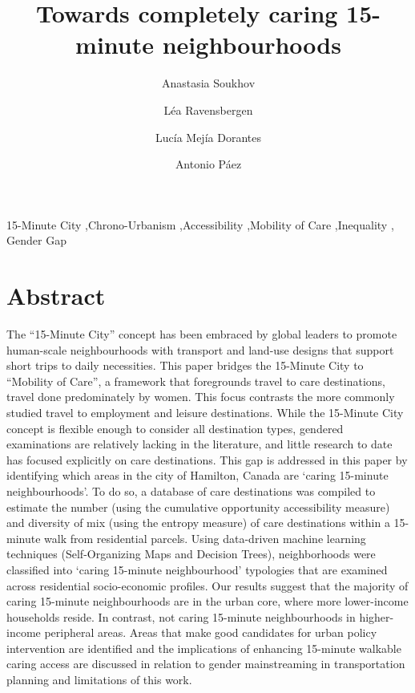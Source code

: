 \documentclass[
  authoryear,
  preprint,
  3p]{elsarticle}
\begin{document}
\begin{frontmatter}
\title{Towards completely caring 15-minute neighbourhoods}
\author[1]{Anastasia Soukhov%
%
}
\author[1]{Léa Ravensbergen%
%
}
\author[2]{Lucía Mejía Dorantes%
%
}
\author[1]{Antonio Páez%
%
}






        





\begin{keyword}
    15-Minute City \sep Chrono-Urbanism \sep Accessibility \sep Mobility
of Care \sep Inequality \sep 
    Gender Gap
\end{keyword}
\end{frontmatter}
    
\section{Abstract}\label{abstract}

The ``15-Minute City'' concept has been embraced by global leaders to
promote human-scale neighbourhoods with transport and land-use designs
that support short trips to daily necessities. This paper bridges the
15-Minute City to ``Mobility of Care'', a framework that foregrounds
travel to care destinations, travel done predominately by women. This
focus contrasts the more commonly studied travel to employment and
leisure destinations. While the 15-Minute City concept is flexible
enough to consider all destination types, gendered examinations are
relatively lacking in the literature, and little research to date has
focused explicitly on care destinations. This gap is addressed in this
paper by identifying which areas in the city of Hamilton, Canada are
`caring 15-minute neighbourhoods'. To do so, a database of care
destinations was compiled to estimate the number (using the cumulative
opportunity accessibility measure) and diversity of mix (using the
entropy measure) of care destinations within a 15-minute walk from
residential parcels. Using data-driven machine learning techniques
(Self-Organizing Maps and Decision Trees), neighborhoods were classified
into `caring 15-minute neighbourhood' typologies that are examined
across residential socio-economic profiles. Our results suggest that the
majority of caring 15-minute neighbourhoods are in the urban core, where
more lower-income households reside. In contrast, not caring 15-minute
neighbourhoods in higher-income peripheral areas. Areas that make good
candidates for urban policy intervention are identified and the
implications of enhancing 15-minute walkable caring access are discussed
in relation to gender mainstreaming in transportation planning and
limitations of this work.
\end{document}
